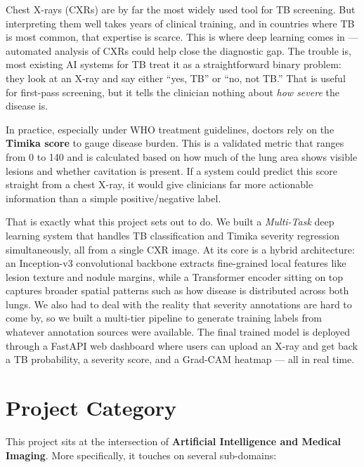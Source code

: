 \documentclass[12pt]{report}
\begin{document}
Chest X-rays (CXRs) are by far the most widely used tool for TB screening. But interpreting them well takes years of clinical training, and in countries where TB is most common, that expertise is scarce. This is where deep learning comes in --- automated analysis of CXRs could help close the diagnostic gap. The trouble is, most existing AI systems for TB treat it as a straightforward binary problem: they look at an X-ray and say either ``yes, TB'' or ``no, not TB.'' That is useful for first-pass screening, but it tells the clinician nothing about \textit{how severe} the disease is.

In practice, especially under WHO treatment guidelines, doctors rely on the \textbf{Timika score} to gauge disease burden. This is a validated metric that ranges from 0 to 140 and is calculated based on how much of the lung area shows visible lesions and whether cavitation is present. If a system could predict this score straight from a chest X-ray, it would give clinicians far more actionable information than a simple positive/negative label.

That is exactly what this project sets out to do. We built a \textit{Multi-Task} deep learning system that handles TB classification and Timika severity regression simultaneously, all from a single CXR image. At its core is a hybrid architecture: an Inception-v3 convolutional backbone extracts fine-grained local features like lesion texture and nodule margins, while a Transformer encoder sitting on top captures broader spatial patterns such as how disease is distributed across both lungs. We also had to deal with the reality that severity annotations are hard to come by, so we built a multi-tier pipeline to generate training labels from whatever annotation sources were available. The final trained model is deployed through a FastAPI web dashboard where users can upload an X-ray and get back a TB probability, a severity score, and a Grad-CAM heatmap --- all in real time.

\section{Project Category}

This project sits at the intersection of \textbf{Artificial Intelligence and Medical Imaging}. More specifically, it touches on several sub-domains:
\end{document}
